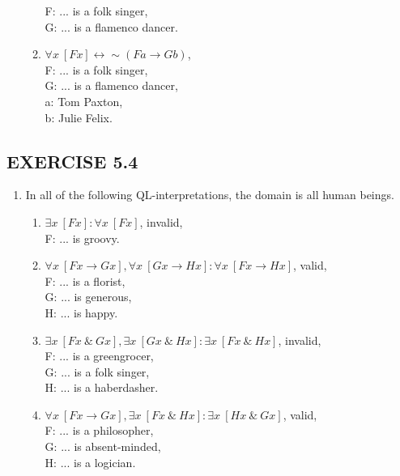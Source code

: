 \documentclass[a4paper,12pt]{article}
\newcommand{\ra}{\rightarrow}
\newcommand{\lra}{\leftrightarrow}
\newcommand{\s}{\sim}
\newcommand{\ta}{ \ \& \ }
\newcommand{\all}{\forall}
\newcommand{\ex}{\exists}
\begin{document}
\begin{enumerate}[label=\arabic*,leftmargin=*]
\begin{enumerate}[label=(\roman*),leftmargin=*]
                    F: ... is a folk singer,\\
                    G: ... is a flamenco dancer.
                \item $\all x \ [Fx] \lra \s (Fa \ra Gb)$,\\
                    F: ... is a folk singer,\\
                    G: ... is a flamenco dancer,\\
                    a: Tom Paxton,\\
                    b: Julie Felix.
            \end{enumerate}

    \end{enumerate}

    \subsection*{EXERCISE 5.4}

    \begin{enumerate}[label=\arabic*,leftmargin=*]
        \item In all of the following QL-interpretations, the domain is all human beings.
            \begin{enumerate}[label=(\roman*),leftmargin=*]
                \item $\ex x \ [Fx] : \all x \ [Fx]$, invalid,\\
                    F: ... is groovy.
                \item $\all x \ [Fx \ra Gx], \all x \ [Gx \ra Hx] : \all x \ [Fx \ra Hx]$, valid,\\
                    F: ... is a florist,\\
                    G: ... is generous,\\
                    H: ... is happy.
                \item $\ex x \ [Fx \ta Gx], \ex x \ [Gx \ta Hx] : \ex x \ [Fx \ta Hx]$, invalid,\\
                    F: ... is a greengrocer,\\
                    G: ... is a folk singer,\\
                    H: ... is a haberdasher.
                \item $\all x \ [Fx \ra Gx], \ex x \ [Fx \ta Hx] : \ex x \ [Hx \ta Gx]$, valid,\\
                    F: ... is a philosopher,\\
                    G: ... is absent-minded,\\
                    H: ... is a logician.
            \end{enumerate}

    \end{enumerate}
\end{document}
